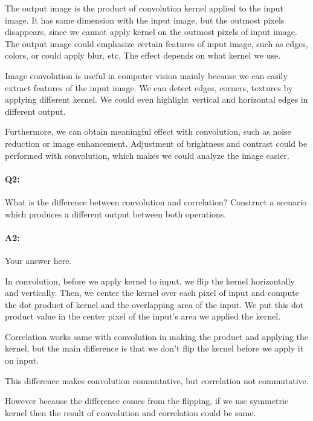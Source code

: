 The output image is the product of convolution kernel applied to the input image. It has same dimension with the input image, but the outmost pixels disappears, since we cannot apply kernel on the outmost pixels of input image. The output image could emphasize certain features of input image, such as edges, colors, or could apply blur, etc. The effect depends on what kernel we use.

Image convolution is useful in computer vision mainly because we can easily extract features of the input image. We can detect edges, corners, textures by applying different kernel. We could even highlight vertical and horizontal edges in different output. 

Furthermore, we can obtain meaningful effect with convolution, such as noise reduction or image enhancement. Adjustment of brightness and contrast could be performed with convolution, which makes we could analyze the image easier.
	
	
	
	
	\pagebreak
	\paragraph{Q2:} What is the difference between convolution and correlation? Construct a scenario which produces a different output between both operations.
	
	
	\paragraph{A2:} Your answer here.
	
	In convolution, before we apply kernel to input, we flip the kernel horizontally and vertically. Then, we center the kernel over each pixel of input and compute the dot product of kernel and the overlapping area of the input. We put this dot product value in the center pixel  of the input’s area we applied the kernel.

Correlation works same with convolution in making the product and applying the kernel, but the main difference is that we don’t flip the kernel before we apply it on input.

This difference makes convolution commutative, but correlation not commutative.

However because the difference comes from the flipping, if we use symmetric kernel then the result of convolution and correlation could be same.

